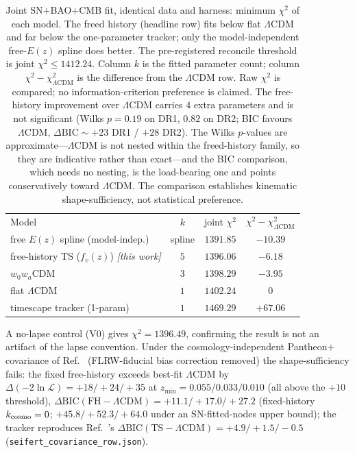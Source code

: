 \documentclass[aps,prd,twocolumn,nofootinbib,superscriptaddress,floatfix]{revtex4-2}
\newcommand{\fvz}{f_{v}(z)}
\newcommand{\Lcdm}{\Lambda\mathrm{CDM}}
\newcommand{\dBIC}{\Delta\mathrm{BIC}}
\begin{document}
\begin{table}[t]
\caption{Joint SN$+$BAO$+$CMB fit, identical data and harness: minimum $\chi^2$
of each model. The freed history (headline row) fits below flat $\Lcdm$ and far
below the one-parameter tracker; only the model-independent free-$E(z)$ spline
does better. The pre-registered reconcile threshold is joint
$\chi^2\le1412.24$. Column $k$ is the fitted parameter count; column
$\chi^2-\chi^2_{\Lcdm}$ is the difference from the $\Lcdm$ row. Raw $\chi^2$ is
compared; no information-criterion preference is claimed. The free-history
improvement over $\Lcdm$ carries $4$ extra parameters and is not significant
(Wilks $p=0.19$ on DR1, $0.82$ on DR2; BIC favours $\Lcdm$, $\dBIC\sim+23$ DR1 /
$+28$ DR2). The Wilks $p$-values are approximate---$\Lcdm$ is not nested within the
freed-history family, so they are indicative rather than exact---and the BIC
comparison, which needs no nesting, is the load-bearing one and points
conservatively toward $\Lcdm$. The comparison establishes kinematic
shape-sufficiency, not statistical preference.}
\label{tab:jointchi2}
\begin{ruledtabular}
\begin{tabular}{lccc}
Model & $k$ & joint $\chi^2$ & $\chi^2-\chi^2_{\Lcdm}$\\
\colrule
free $E(z)$ spline (model-indep.)      & spline & $1391.85$ & $-10.39$\\
free-history TS ($\fvz$) \emph{[this work]} & $5$ & $1396.06$ & $-6.18$\\
$w_0w_a$CDM                            & $3$ & $1398.29$ & $-3.95$\\
flat $\Lcdm$                           & $1$ & $1402.24$ & $0$\\
timescape tracker (1-param)           & $1$ & $1469.29$ & $+67.06$\\
\end{tabular}
\end{ruledtabular}
\footnotesize A no-lapse control (V0) gives $\chi^2=1396.49$, confirming the
result is not an artifact of the lapse convention. Under the
cosmology-independent Pantheon$+$ covariance of Ref.~\cite{Seifert2024}
(FLRW-fiducial bias correction removed) the shape-sufficiency fails: the fixed
free-history exceeds best-fit $\Lcdm$ by $\Delta(-2\ln\mathcal{L})=+18/+24/+35$ at
$z_{\min}=0.055/0.033/0.010$ (all above the $+10$ threshold),
$\dBIC(\mathrm{FH}-\Lcdm)=+11.1/+17.0/+27.2$ (fixed-history $k_{\rm cosmo}=0$;
$+45.8/+52.3/+64.0$ under an SN-fitted-nodes upper bound); the tracker reproduces
Ref.~\cite{Seifert2024}'s $\dBIC(\mathrm{TS}-\Lcdm)=+4.9/+1.5/-0.5$
(\texttt{seifert\_covariance\_row.json}).
\end{table}
\end{document}
